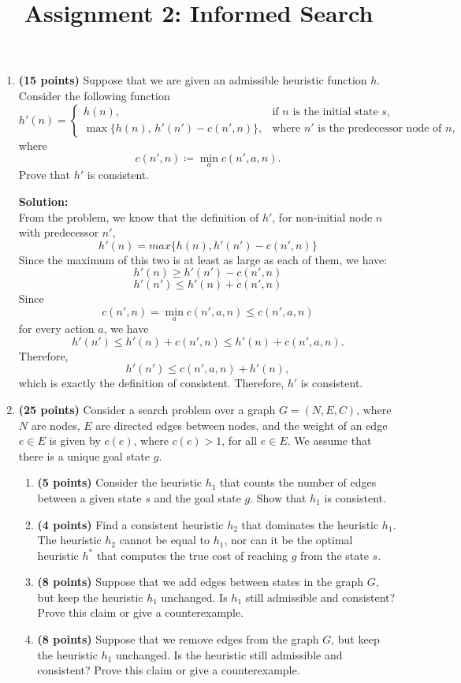 \documentclass[11pt]{article}
\title{Assignment 2: Informed Search}
\author{}
\date{}
\begin{document}
\maketitle
\vspace{-3em}

\begin{enumerate}[label=\textbf{\arabic*.}, leftmargin=*]
    \item \textbf{(15 points)} Suppose that we are given an admissible heuristic function $h$. Consider the following function
    \[
        h'(n) =
        \begin{cases}
            h(n), & \text{if } n \text{ is the initial state } s,\\[4pt]
            \max\{h(n),\, h'(n') - c(n',n)\}, & \text{where } n' \text{ is the predecessor node of } n,
        \end{cases}
    \]
    where
    \[
        c(n',n) \coloneqq \min_a c(n',a,n).
    \]
    Prove that $h'$ is consistent.

    \textbf{Solution:}\\
    From the problem, we know that the definition of $h'$, for non-initial node $n$ with predecessor $n'$, 
\[h'(n) = max\{h(n), h'(n') - c(n', n)\}\]
    Since the maximum of this two is at least as large as each of them, we have:
\[h'(n) \ge h'(n') - c(n', n) \]
\[h'(n') \le h'(n) + c(n', n)\]
Since
\[
c(n',n)=\min_a c(n',a,n)\le c(n',a,n)
\]
for every action $a$, we have
\[
h'(n')\le h'(n)+c(n',n)\le h'(n)+c(n',a,n).
\]
Therefore,
\[
h'(n')\le c(n',a,n)+h'(n),
\]
which is exactly the definition of consistent. Therefore, $h'$ is consistent.
    \newpage

    \item \textbf{(25 points)} Consider a search problem over a graph $G = (N,E,C)$, where $N$ are nodes, $E$ are directed edges between nodes, and the weight of an edge $e \in E$ is given by $c(e)$, where $c(e) > 1$, for all $e \in E$. We assume that there is a unique goal state $g$.
    \begin{enumerate}[label=(\alph*)]
        \item \textbf{(5 points)} Consider the heuristic $h_1$ that counts the number of edges between a given state $s$ and the goal state $g$. Show that $h_1$ is consistent.
        \item \textbf{(4 points)} Find a consistent heuristic $h_2$ that dominates the heuristic $h_1$. The heuristic $h_2$ cannot be equal to $h_1$, nor can it be the optimal heuristic $h^*$ that computes the true cost of reaching $g$ from the state $s$.
        \item \textbf{(8 points)} Suppose that we add edges between states in the graph $G$, but keep the heuristic $h_1$ unchanged. Is $h_1$ still admissible and consistent? Prove this claim or give a counterexample.
        \item \textbf{(8 points)} Suppose that we remove edges from the graph $G$, but keep the heuristic $h_1$ unchanged. Is the heuristic still admissible and consistent? Prove this claim or give a counterexample.
    \end{enumerate}
    

\end{enumerate}
\end{document}
